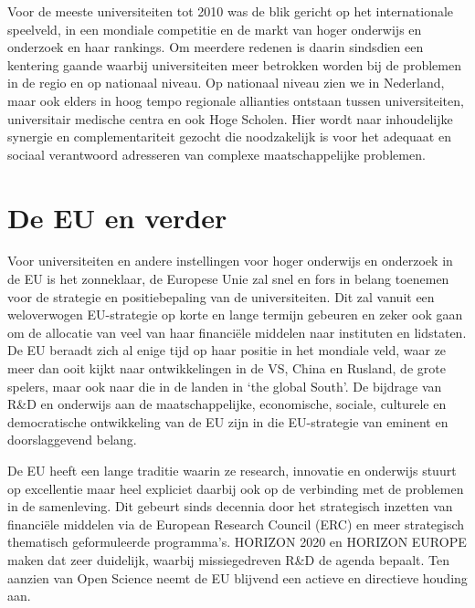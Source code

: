 \documentclass{jote-book}
\begin{document}
	Voor de meeste universiteiten tot 2010 was de blik gericht op het internationale speelveld, in een mondiale competitie en de markt van hoger onderwijs en onderzoek en haar rankings. Om meerdere redenen is daarin sindsdien een kentering gaande waarbij universiteiten meer betrokken worden bij de problemen in de regio en op nationaal niveau. Op nationaal niveau zien we in Nederland, maar ook elders in hoog tempo regionale allianties ontstaan tussen universiteiten, universitair medische centra en ook Hoge Scholen. Hier wordt naar inhoudelijke synergie en complementariteit gezocht die noodzakelijk is voor het adequaat en sociaal verantwoord adresseren van complexe maatschappelijke problemen.



	\section{De EU en verder }



	Voor universiteiten en andere instellingen voor hoger onderwijs en onderzoek in de EU is het zonneklaar, de Europese Unie zal snel en fors in belang toenemen voor de strategie en positiebepaling van de universiteiten. Dit zal vanuit een weloverwogen EU-strategie op korte en lange termijn gebeuren en zeker ook gaan om de allocatie van veel van haar financiële middelen naar instituten en lidstaten. De EU beraadt zich al enige tijd op haar positie in het mondiale veld, waar ze meer dan ooit kijkt naar ontwikkelingen in de VS, China en Rusland, de grote spelers, maar ook naar die in de landen in ‘the global South'. De bijdrage van R\&D en onderwijs aan de maatschappelijke, economische, sociale, culturele en democratische ontwikkeling van de EU zijn in die EU-strategie van eminent en doorslaggevend belang.



	De EU heeft een lange traditie waarin ze research, innovatie en onderwijs stuurt op excellentie maar heel expliciet daarbij ook op de verbinding met de problemen in de samenleving. Dit gebeurt sinds decennia door het strategisch inzetten van financiële middelen via de European Research Council (ERC) en meer strategisch thematisch geformuleerde programma's. HORIZON 2020 en HORIZON EUROPE maken dat zeer duidelijk, waarbij missiegedreven R\&D de agenda bepaalt. Ten aanzien van Open Science neemt de EU blijvend een actieve en directieve houding aan.
\end{document}
